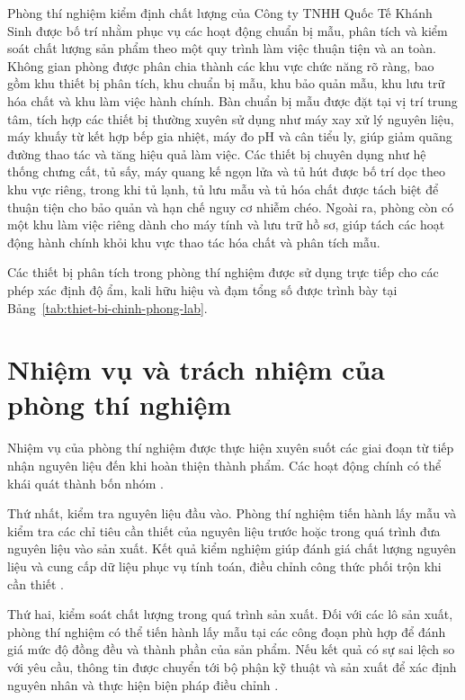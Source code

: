 Phòng thí nghiệm kiểm định chất lượng của Công ty TNHH Quốc Tế Khánh Sinh được bố trí nhằm phục vụ các hoạt động chuẩn bị mẫu, phân tích và kiểm soát chất lượng sản phẩm theo một quy trình làm việc thuận tiện và an toàn. 
Không gian phòng được phân chia thành các khu vực chức năng rõ ràng, bao gồm khu thiết bị phân tích, khu chuẩn bị mẫu, khu bảo quản mẫu, khu lưu trữ hóa chất và khu làm việc hành chính. 
Bàn chuẩn bị mẫu được đặt tại vị trí trung tâm, tích hợp các thiết bị thường xuyên sử dụng như máy xay xử lý nguyên liệu, máy khuấy từ kết hợp bếp gia nhiệt, máy đo pH và cân tiểu ly, giúp giảm quãng đường thao tác và tăng hiệu quả làm việc. 
Các thiết bị chuyên dụng như hệ thống chưng cất, tủ sấy, máy quang kế ngọn lửa và tủ hút được bố trí dọc theo khu vực riêng, trong khi tủ lạnh, tủ lưu mẫu và tủ hóa chất được tách biệt để thuận tiện cho bảo quản và hạn chế nguy cơ nhiễm chéo. 
Ngoài ra, phòng còn có một khu làm việc riêng dành cho máy tính và lưu trữ hồ sơ, giúp tách các hoạt động hành chính khỏi khu vực thao tác hóa chất và phân tích mẫu.

{\renewcommand{\figurename}{Sơ đồ}
\renewcommand{\thefigure}{\arabic{figure}}
\setcounter{figure}{1}

}
Các thiết bị phân tích trong phòng thí nghiệm được sử dụng trực tiếp cho các phép xác định độ ẩm, kali hữu hiệu và đạm tổng số được trình bày tại Bảng~\ref{tab:thiet-bi-chinh-phong-lab}.



\section{Nhiệm vụ và trách nhiệm của phòng thí nghiệm}
Nhiệm vụ của phòng thí nghiệm được thực hiện xuyên suốt các giai đoạn từ tiếp nhận nguyên liệu đến khi hoàn thiện thành phẩm. 
Các hoạt động chính có thể khái quát thành bốn nhóm \cite{company-internal-documents}.

Thứ nhất, kiểm tra nguyên liệu đầu vào. 
Phòng thí nghiệm tiến hành lấy mẫu và kiểm tra các chỉ tiêu cần thiết của nguyên liệu trước hoặc trong quá trình đưa nguyên liệu vào sản xuất. 
Kết quả kiểm nghiệm giúp đánh giá chất lượng nguyên liệu và cung cấp dữ liệu phục vụ tính toán, điều chỉnh công thức phối trộn khi cần thiết \cite{company-internal-documents}.

Thứ hai, kiểm soát chất lượng trong quá trình sản xuất. 
Đối với các lô sản xuất, phòng thí nghiệm có thể tiến hành lấy mẫu tại các công đoạn phù hợp để đánh giá mức độ đồng đều và thành phần của sản phẩm. 
Nếu kết quả có sự sai lệch so với yêu cầu, thông tin được chuyển tới bộ phận kỹ thuật và sản xuất để xác định nguyên nhân và thực hiện biện pháp điều chỉnh \cite{company-internal-documents}.

